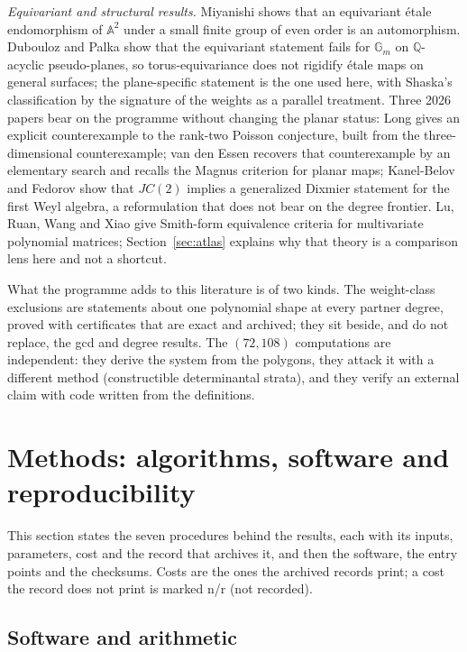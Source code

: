 \documentclass[11pt]{article}
\theoremstyle{remark}
\newcommand{\Gm}{\mathbb{G}_m}
\begin{document}
\emph{Equivariant and structural results.} Miyanishi \cite{Miyanishi2023} shows that an equivariant
\'etale endomorphism of $\mathbb A^2$ under a small finite group of even order is an automorphism.
Dubouloz and Palka \cite{DuboulozPalka2018} show that the equivariant statement fails for $\Gm$ on
$\mathbb Q$-acyclic pseudo-planes, so torus-equivariance does not rigidify \'etale maps on general
surfaces; the plane-specific statement is the one used here, with Shaska's classification by the signature of the weights
\cite{Shaska2026} as a parallel treatment. Three 2026 papers bear on the programme without
changing the planar status: Long \cite{Long2026} gives an explicit counterexample to the rank-two
Poisson conjecture, built from the three-dimensional counterexample; van den Essen \cite{vdEssen2026}
recovers that counterexample by an elementary search and recalls the Magnus criterion for planar maps;
Kanel-Belov and Fedorov \cite{KanelBelovFedorov2026} show that $JC(2)$ implies a generalized Dixmier
statement for the first Weyl algebra, a reformulation that does not bear on the degree frontier. Lu, Ruan,
Wang and Xiao \cite{LuRuanWangXiao2026} give Smith-form equivalence criteria for multivariate polynomial
matrices; Section~\ref{sec:atlas} explains why that theory is a comparison lens here and not a shortcut.

What the programme adds to this literature is of two kinds. The weight-class exclusions are
statements about one polynomial shape at every partner degree, proved with certificates that are
exact and archived; they sit beside, and do not replace, the gcd and degree results. The
$(72,108)$ computations are independent: they derive the system from the polygons, they attack it
with a different method (constructible determinantal strata), and they verify an external claim
with code written from the definitions.

\section{Methods: algorithms, software and reproducibility}\label{sec:methods}

This section states the seven procedures behind the results, each with its inputs, parameters,
cost and the record that archives it, and then the software, the entry points and the checksums.
Costs are the ones the archived records print; a cost the record does not print is marked n/r (not
recorded).

\subsection{Software and arithmetic}
\end{document}
